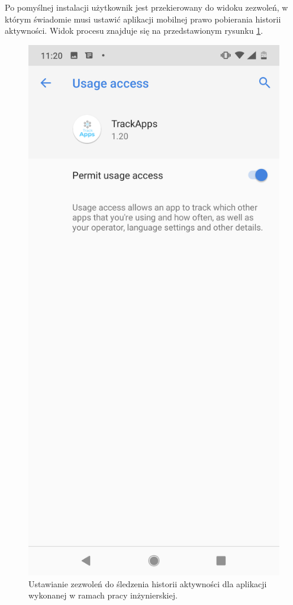 \documentclass[a4paper,twoside,12pt]{book}
\begin{document}
Po pomyślnej instalacji użytkownik jest przekierowany do widoku zezwoleń, w którym świadomie musi ustawić aplikacji mobilnej prawo pobierania historii aktywności. Widok procesu znajduje się na przedstawionym rysunku \ref{fig:usage_access}.

\begin{figure}[h!]
    \centering
    \includegraphics[scale=0.2]{images/usage_access_screen.png}
    \caption{Ustawianie zezwoleń do śledzenia historii aktywności dla aplikacji wykonanej w ramach pracy inżynierskiej.}
    \label{fig:usage_access}
\end{figure}
\end{document}
